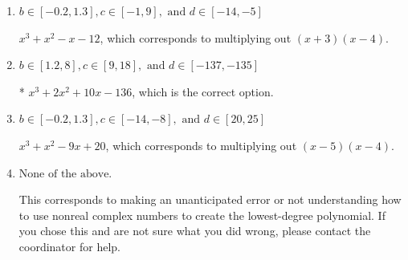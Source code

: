 \documentclass{extbook}[14pt]
\begin{document}
\begin{enumerate}
{\begin{enumerate}[label=\Alph*.]
$x^{3} -2 x^{2} +10 x + 136$, which corresponds to multiplying out $(x-(-3 + 5 i))(x-(-3 - 5 i))(x + 4)$.
\item \( b \in [-0.2, 1.3], c \in [-1, 9], \text{ and } d \in [-14, -5] \)

$x^{3} + x^{2} -x -12$, which corresponds to multiplying out $(x + 3)(x -4)$.
\item \( b \in [1.2, 8], c \in [9, 18], \text{ and } d \in [-137, -135] \)

* $x^{3} +2 x^{2} +10 x -136$, which is the correct option.
\item \( b \in [-0.2, 1.3], c \in [-14, -8], \text{ and } d \in [20, 25] \)

$x^{3} + x^{2} -9 x + 20$, which corresponds to multiplying out $(x -5)(x -4)$.
\item \( \text{None of the above.} \)

This corresponds to making an unanticipated error or not understanding how to use nonreal complex numbers to create the lowest-degree polynomial. If you chose this and are not sure what you did wrong, please contact the coordinator for help.
\end{enumerate}

}
\end{enumerate}
\end{document}
